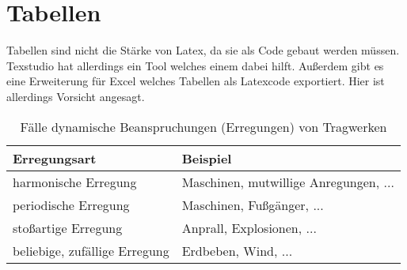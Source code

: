 \section{Tabellen}
\label{sec:tabelle}
Tabellen sind nicht die Stärke von Latex, da sie als Code gebaut werden müssen. Texstudio hat allerdings ein Tool welches einem dabei hilft. Außerdem gibt es eine Erweiterung für Excel welches Tabellen als Latexcode exportiert. Hier ist allerdings Vorsicht angesagt.
\begin{table}[h]
	\centering
	\caption{Fälle dynamische Beanspruchungen (Erregungen) von Tragwerken}	
	\begin{tabular}{ll}
		\toprule
		\textbf{Erregungsart} & \textbf{Beispiel} \\\midrule
		harmonische Erregung & Maschinen, mutwillige Anregungen, ...\\ 
		periodische Erregung & Maschinen, Fußgänger, ...\\ 
		stoßartige Erregung & Anprall, Explosionen, ...\\ 
		beliebige, zufällige Erregung & Erdbeben, Wind, ...\\ \bottomrule
	\end{tabular} 
\end{table}
\cleardoublepage